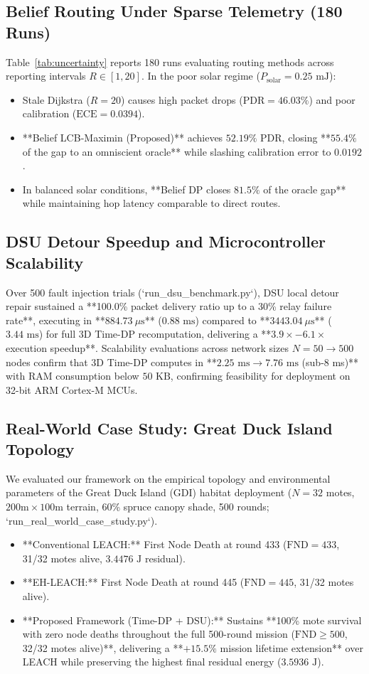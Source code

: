 \documentclass[journal]{IEEEtran}
\begin{document}
\subsection{Belief Routing Under Sparse Telemetry (180 Runs)}
Table~\ref{tab:uncertainty} reports 180 runs evaluating routing methods across reporting intervals $R \in [1, 20]$. In the poor solar regime ($P_{\text{solar}} = 0.25\text{ mJ}$):
\begin{itemize}
    \item Stale Dijkstra ($R=20$) causes high packet drops ($\text{PDR} = 46.03\%$) and poor calibration ($\text{ECE} = 0.0394$).
    \item **Belief LCB-Maximin (Proposed)** achieves $\mathbf{52.19\%}$ PDR, closing **$55.4\%$ of the gap to an omniscient oracle** while slashing calibration error to $\mathbf{0.0192}$.
    \item In balanced solar conditions, **Belief DP closes $81.5\%$ of the oracle gap** while maintaining hop latency comparable to direct routes.
\end{itemize}

\subsection{DSU Detour Speedup and Microcontroller Scalability}
Over 500 fault injection trials (`run_dsu_benchmark.py`), DSU local detour repair sustained a **100.0\% packet delivery ratio up to a 30\% relay failure rate**, executing in **$884.73\ \mu\text{s}$** ($0.88\text{ ms}$) compared to **$3443.04\ \mu\text{s}$** ($3.44\text{ ms}$) for full 3D Time-DP recomputation, delivering a **$3.9\times - 6.1\times$ execution speedup**. Scalability evaluations across network sizes $N = 50 \to 500$ nodes confirm that 3D Time-DP computes in **$2.25\text{ ms} \to 7.76\text{ ms}$ (sub-8 ms)** with RAM consumption below $50\text{ KB}$, confirming feasibility for deployment on 32-bit ARM Cortex-M MCUs.

\subsection{Real-World Case Study: Great Duck Island Topology}
We evaluated our framework on the empirical topology and environmental parameters of the Great Duck Island (GDI) habitat deployment ($N=32$ motes, $200\text{m} \times 100\text{m}$ terrain, 60\% spruce canopy shade, 500 rounds; `run_real_world_case_study.py`).
\begin{itemize}
    \item **Conventional LEACH:** First Node Death at round 433 ($\text{FND}=433$, 31/32 motes alive, $3.4476\text{ J}$ residual).
    \item **EH-LEACH:** First Node Death at round 445 ($\text{FND}=445$, 31/32 motes alive).
    \item **Proposed Framework (Time-DP + DSU):** Sustains **100\% mote survival with zero node deaths throughout the full 500-round mission ($\text{FND} \ge 500$, 32/32 motes alive)**, delivering a **$+15.5\%$ mission lifetime extension** over LEACH while preserving the highest final residual energy ($3.5936\text{ J}$).
\end{itemize}
\end{document}
